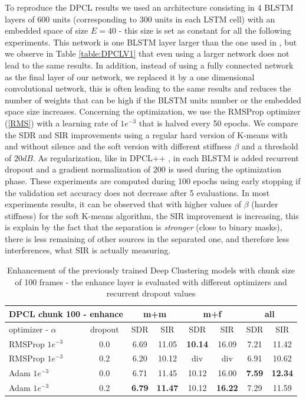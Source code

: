 \documentclass[master, tikz, final,11pt, dvipdfmx]{iscs-thesis}
\begin{document}
To reproduce the DPCL results we used an architecture consisting in 4 BLSTM layers of 600 units (corresponding to 300 units in each LSTM cell) with an embedded space of size $E=40$ - this size is set as constant for all the following experiments. This network is one BLSTM layer larger than the one used in \cite{DPCLV1}, but we observe in Table \ref{table:DPCLV1} that even using a larger network does not lead to the same results. In addition, instead of using a fully connected network as the final layer of our network, we replaced it by a one dimensional convolutional network, this is often leading to the same results and reduces the number of weights that can be high if the BLSTM units number or the embedded space size increases. Concerning the optimization, we use the RMSProp optimizer (\ref{RMS}) with a learning rate of $1e^{-3}$ that is halved every 50 epochs. We compare the SDR and SIR improvements using a regular hard version of K-means with and without silence and the soft version with different stiffness $\beta$ and a threshold of $20dB$. As regularization, like in DPCL++ \cite{DPCLV2}, in each BLSTM is added recurrent dropout and a gradient normalization of $200$ is used during the optimization phase.
These experiments are computed during 100 epochs using early stopping if the validation set accuracy does not decrease after 5 evaluations.
In most experiments results, it can be observed that with higher values of $\beta$ (harder stiffness) for the soft K-means algorithm, the SIR improvement is increasing, this is explain by the fact that the separation is \textit{stronger} (close to binary masks), there is less remaining of other sources in the separated one, and therefore less interferences, what SIR is actually measuring.

\begin{table}[h]
\centering
\begin{tabular}{l|c|c|c|c|c|c|c}
\multicolumn{2}{c|}{DPCL chunk 100 - enhance} & \multicolumn{2}{c|}{m+m} & \multicolumn{2}{c|}{m+f} & \multicolumn{2}{c}{all} \\ 
\hline 
optimizer - $\alpha$ & dropout & SDR & SIR & SDR & SIR & SDR & SIR \\ 
\hline 
RMSProp $1e^{-3}$ & 0.0 & 6.69 & 11.05 & \textbf{10.14} & 16.09 & 7.21 & 11.42 \\ 
RMSProp $1e^{-3}$ & 0.2 & 6.20 & 10.12 & div & div & 6.91 & 10.62 \\ 
Adam $1e^{-3}$ & 0.0 & 6.71 & 11.45 & 10.12 & 16.00 & \textbf{7.59} & \textbf{12.34} \\ 
Adam $1e^{-3}$ & 0.2 &\textbf{6.79}& \textbf{11.47} & 10.12 & \textbf{16.22} & 7.29 & 11.59 \\ 
\end{tabular}
\captionsetup{justification=centering}
\caption[enh]{Enhancement of the previously trained Deep Clustering models with chunk size of 100 frames - the enhance layer is evaluated with different optimizers and recurrent dropout values}
\label{table:DPCL100enh}
\end{table}
\end{document}
